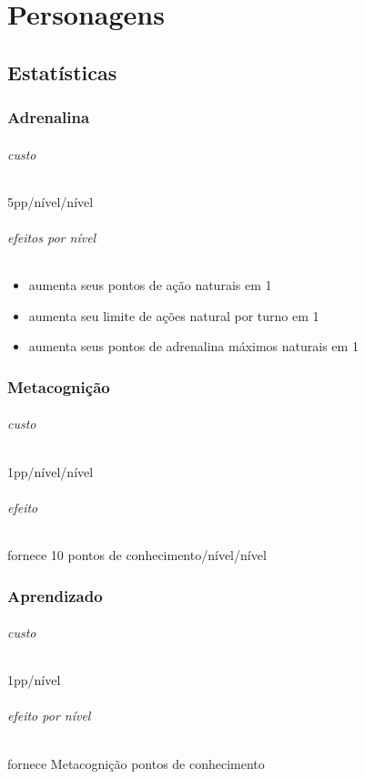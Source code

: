 \clearpage{}
\part{Personagens}
\clearpage{}
\chapter{Estatísticas}
\section{Adrenalina}
\paragraph{custo} 5pp/nível/nível
\paragraph{efeitos por nível} 
\begin{itemize}
  \item aumenta seus pontos de ação naturais em 1 
  \item aumenta seu limite de ações natural por turno em 1 
  \item aumenta seus pontos de adrenalina máximos naturais em 1
\end{itemize}
%
%
\section{Metacognição}
\paragraph{custo} 1pp/nível/nível
\paragraph{efeito} fornece 10 pontos de conhecimento/nível/nível
%
%
\section{Aprendizado}
\paragraph{custo} 1pp/nível
\paragraph{efeito por nível} fornece Metacognição pontos de conhecimento
%
%
